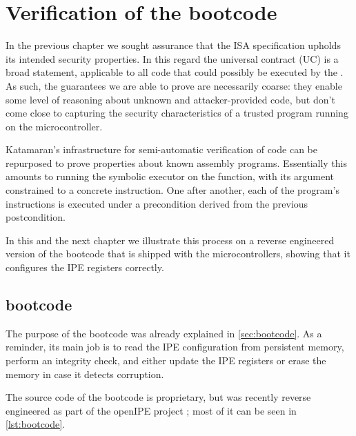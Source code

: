 \chapter{Verification of the \texorpdfstring{\msp}{MSP430} bootcode}
\label{ch:block-verifier}

In the previous chapter we sought assurance that the ISA specification upholds its intended security properties. In this regard the universal contract (UC) is a broad statement, applicable to all code that could possibly be executed by the \msp. As such, the guarantees we are able to prove are necessarily coarse: they enable some level of reasoning about unknown and attacker-provided code, but don't come close to capturing the security characteristics of a trusted program running on the microcontroller.

Katamaran's infrastructure for semi-automatic verification of \usail code can be repurposed to prove properties about known assembly programs. Essentially this amounts to running the symbolic executor on the  function, with its argument constrained to a concrete instruction. One after another, each of the program's instructions is executed under a precondition derived from the previous postcondition.

In this and the next chapter we illustrate this process on a reverse engineered version of the bootcode that is shipped with the \msp microcontrollers, showing that it configures the IPE registers correctly.

\section{\texorpdfstring{\msp}{MSP430} bootcode}

The purpose of the bootcode was already explained in \cref{sec:bootcode}. As a reminder, its main job is to read the IPE configuration from persistent memory, perform an integrity check, and either update the IPE registers or erase the memory in case it detects corruption.

The source code of the bootcode is proprietary, but was recently reverse engineered as part of the openIPE project \cite{Bognar2025}; most of it can be seen in \cref{lst:bootcode}.

